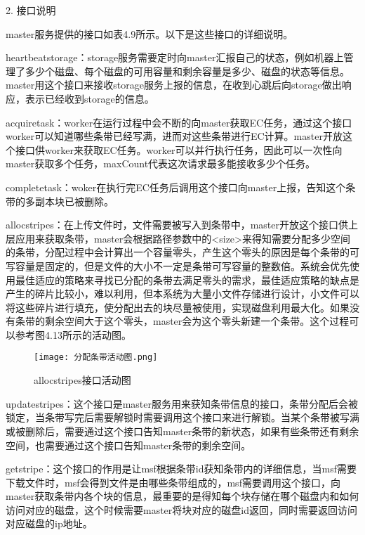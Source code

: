 2. 接口说明

master服务提供的接口如表4.9所示。以下是这些接口的详细说明。

heartbeatstorage：storage服务需要定时向master汇报自己的状态，例如机器上管理了多少个磁盘、每个磁盘的可用容量和剩余容量是多少、磁盘的状态等信息。master用这个接口来接收storage服务上报的信息，在收到心跳后向storage做出响应，表示已经收到storage的信息。

acquiretask：worker在运行过程中会不断的向master获取EC任务，通过这个接口worker可以知道哪些条带已经写满，进而对这些条带进行EC计算。master开放这个接口供worker来获取EC任务。worker可以并行执行任务，因此可以一次性向master获取多个任务，maxCount代表这次请求最多能接收多少个任务。

completetask：woker在执行完EC任务后调用这个接口向master上报，告知这个条带的多副本块已被删除。

allocstripes：在上传文件时，文件需要被写入到条带中，master开放这个接口供上层应用来获取条带，master会根据路径参数中的<size>来得知需要分配多少空间的条带，分配过程中会计算出一个容量零头，产生这个零头的原因是每个条带的可写容量是固定的，但是文件的大小不一定是条带可写容量的整数倍。系统会优先使用最佳适应的策略来寻找已分配的条带去满足零头的需求，最佳适应策略的缺点是产生的碎片比较小，难以利用，但本系统为大量小文件存储进行设计，小文件可以将这些碎片进行填充，使分配出去的块尽量被使用，实现磁盘利用最大化。如果没有条带的剩余空间大于这个零头，master会为这个零头新建一个条带。这个过程可以参考图4.13所示的活动图。

\begin{figure}
  \centering
  \texttt{[image: 分配条带活动图.png]}
  \caption{allocstripes接口活动图}
\end{figure}

updatestripes：这个接口是master服务用来获知条带信息的接口，条带分配后会被锁定，当条带写完后需要解锁时需要调用这个接口来进行解锁。当某个条带被写满或被删除后，需要通过这个接口告知master条带的新状态，如果有些条带还有剩余空间，也需要通过这个接口告知master条带的剩余空间。

getstripe：这个接口的作用是让msf根据条带id获知条带内的详细信息，当msf需要下载文件时，msf会得到文件是由哪些条带组成的，msf需要调用这个接口，向master获取条带内各个块的信息，最重要的是得知每个块存储在哪个磁盘内和如何访问对应的磁盘，这个时候需要master将块对应的磁盘id返回，同时需要返回访问对应磁盘的ip地址。


